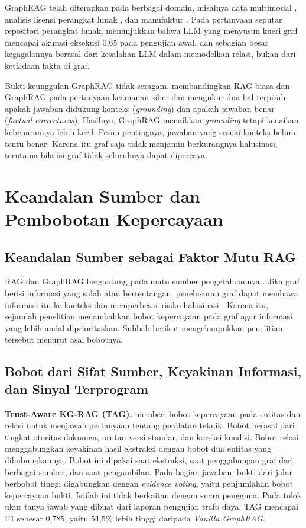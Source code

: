 GraphRAG telah diterapkan pada berbagai domain, misalnya data multimodal \autocite{Ali2026}, analisis lisensi perangkat lunak \autocite{BenKhalifa2026}, dan manufaktur \autocite{Zhou2026}. Pada pertanyaan seputar repositori perangkat lunak, \textcite{Abedu2026} menunjukkan bahwa LLM yang menyusun kueri graf mencapai akurasi eksekusi 0,65 pada pengujian awal, dan sebagian besar kegagalannya berasal dari kesalahan LLM dalam memodelkan relasi, bukan dari ketiadaan fakta di graf.

Bukti keunggulan GraphRAG tidak seragam. \textcite{Pandilova2026} membandingkan RAG biasa dan GraphRAG pada pertanyaan keamanan siber dan mengukur dua hal terpisah: apakah jawaban didukung konteks (\emph{grounding}) dan apakah jawaban benar (\emph{factual correctness}). Hasilnya, GraphRAG menaikkan \emph{grounding} tetapi kenaikan kebenarannya lebih kecil. Pesan pentingnya, jawaban yang sesuai konteks belum tentu benar. Karena itu graf saja tidak menjamin berkurangnya halusinasi, terutama bila isi graf tidak seluruhnya dapat dipercaya.

\section{Keandalan Sumber dan Pembobotan Kepercayaan}
\label{sec:keandalan}

\subsection{Keandalan Sumber sebagai Faktor Mutu RAG}

RAG dan GraphRAG bergantung pada mutu sumber pengetahuannya \autocite{WangXL2026}. Jika graf berisi informasi yang salah atau bertentangan, penelusuran graf dapat membawa informasi itu ke konteks dan memperbesar risiko halusinasi \autocite{Huang2025}. Karena itu, sejumlah penelitian menambahkan bobot kepercayaan pada graf agar informasi yang lebih andal diprioritaskan. Subbab berikut mengelompokkan penelitian tersebut menurut asal bobotnya.

\subsection{Bobot dari Sifat Sumber, Keyakinan Informasi, dan Sinyal Terprogram}

\textbf{Trust-Aware KG-RAG (TAG).} \textcite{Shi2026} memberi bobot kepercayaan pada entitas dan relasi untuk menjawab pertanyaan tentang peralatan teknik. Bobot berasal dari tingkat otoritas dokumen, urutan versi standar, dan koreksi kondisi. Bobot relasi menggabungkan keyakinan hasil ekstraksi dengan bobot dua entitas yang dihubungkannya. Bobot ini dipakai saat ekstraksi, saat penggabungan graf dari berbagai sumber, dan saat pengambilan. Pada bagian jawaban, bukti dari jalur berbobot tinggi digabungkan dengan \emph{evidence voting}, yaitu penjumlahan bobot kepercayaan bukti. Istilah ini tidak berkaitan dengan suara pengguna. Pada tolok ukur tanya jawab yang dibuat dari laporan pengujian trafo daya, TAG mencapai F1 sebesar 0,785, yaitu 54,5\% lebih tinggi daripada \emph{Vanilla GraphRAG}.

